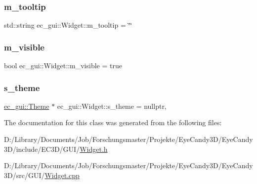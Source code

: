 \mbox{\label{classec__gui_1_1_widget_ade1a9106e3877f2f56ea1473b4964c74}} 
\subsubsection{\texorpdfstring{m\+\_\+tooltip}{m\_tooltip}}
{\footnotesize\ttfamily std\+::string ec\+\_\+gui\+::\+Widget\+::m\+\_\+tooltip = \char`\"{}\char`\"{}\hspace{0.3cm}{\ttfamily [protected]}}

\mbox{\label{classec__gui_1_1_widget_ac9266ce41736476342354d016d4535b2}} 
\subsubsection{\texorpdfstring{m\+\_\+visible}{m\_visible}}
{\footnotesize\ttfamily bool ec\+\_\+gui\+::\+Widget\+::m\+\_\+visible = true\hspace{0.3cm}{\ttfamily [protected]}}

\mbox{\label{classec__gui_1_1_widget_aabaff3a7961627152cd9555631be45ec}} 
\subsubsection{\texorpdfstring{s\+\_\+theme}{s\_theme}}
{\footnotesize\ttfamily \mbox{\hyperlink{classec__gui_1_1_theme}{ec\+\_\+gui\+::\+Theme}} $\ast$ ec\+\_\+gui\+::\+Widget\+::s\+\_\+theme = nullptr\hspace{0.3cm}{\ttfamily [static]}, {\ttfamily [protected]}}



The documentation for this class was generated from the following files\+:\begin{DoxyCompactItemize}
\item 
D\+:/\+Library/\+Documents/\+Job/\+Forschungsmaster/\+Projekte/\+Eye\+Candy3\+D/\+Eye\+Candy3\+D/include/\+E\+C3\+D/\+G\+U\+I/\mbox{\hyperlink{_widget_8h}{Widget.\+h}}\item 
D\+:/\+Library/\+Documents/\+Job/\+Forschungsmaster/\+Projekte/\+Eye\+Candy3\+D/\+Eye\+Candy3\+D/src/\+G\+U\+I/\mbox{\hyperlink{_widget_8cpp}{Widget.\+cpp}}\end{DoxyCompactItemize}
